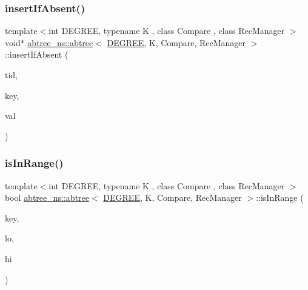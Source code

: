 \mbox{\label{classabtree__ns_1_1abtree_a560964a145c9c4d8525486aa9dda48d5}} 
\subsubsection{\texorpdfstring{insert\+If\+Absent()}{insertIfAbsent()}\hspace{0.1cm}{\footnotesize\ttfamily [2/2]}}
{\footnotesize\ttfamily template$<$int D\+E\+G\+R\+EE, typename K , class Compare , class Rec\+Manager $>$ \\
void$\ast$ \hyperlink{classabtree__ns_1_1abtree}{abtree\+\_\+ns\+::abtree}$<$ \hyperlink{brown__sigouin__abtree__kcas_2adapter_8h_a5d88b17d70c985f2f2b8e987037fd6dd}{D\+E\+G\+R\+EE}, K, Compare, Rec\+Manager $>$\+::insert\+If\+Absent (\begin{DoxyParamCaption}\item[{const int}]{tid,  }\item[{const K \&}]{key,  }\item[{void $\ast$const}]{val }\end{DoxyParamCaption})\hspace{0.3cm}{\ttfamily [inline]}}

\mbox{\label{classabtree__ns_1_1abtree_ad58b181e12c77651b3e589617f94c1f5}} 
\subsubsection{\texorpdfstring{is\+In\+Range()}{isInRange()}}
{\footnotesize\ttfamily template$<$int D\+E\+G\+R\+EE, typename K , class Compare , class Rec\+Manager $>$ \\
bool \hyperlink{classabtree__ns_1_1abtree}{abtree\+\_\+ns\+::abtree}$<$ \hyperlink{brown__sigouin__abtree__kcas_2adapter_8h_a5d88b17d70c985f2f2b8e987037fd6dd}{D\+E\+G\+R\+EE}, K, Compare, Rec\+Manager $>$\+::is\+In\+Range (\begin{DoxyParamCaption}\item[{const K \&}]{key,  }\item[{const K \&}]{lo,  }\item[{const K \&}]{hi }\end{DoxyParamCaption})\hspace{0.3cm}{\ttfamily [inline]}}

